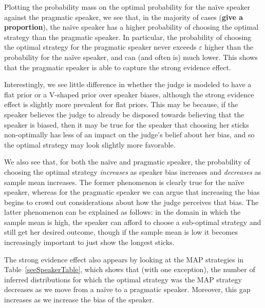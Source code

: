 \documentclass[10pt,letterpaper]{article}
\begin{document}
Plotting the probability mass on the optimal probability for the na\"ive speaker against the pragmatic speaker, we see that,
in the majority of cases (\textbf{give a proportion}), the na\"ive speaker has a higher probability of choosing the optimal 
strategy than the pragmatic speaker. In particular, the probability of choosing the optimal strategy for the pragmatic speaker never
exceeds $\varepsilon$ higher than the probability for the na\"ive speaker, and can (and often is) much lower. This shows that the 
pragmatic speaker is able to capture the strong evidence effect.

Interestingly, we see little difference in whether the judge is modeled to have a flat prior or a V-shaped prior over speaker biases,
although the strong evidence effect is slightly more prevalent for flat priors. This may be because, if the speaker believes the judge 
to already be disposed towards believing that the speaker is biased, then it may be true for the speaker that choosing her sticks 
non-optimally has less of an impact on the judge's belief about her bias, and so the optimal strategy may look slightly more 
favorable.

We also see that, for both the na\"ive and pragmatic speaker, the probability of choosing the optimal strategy \textit{increases} as
speaker bias increases and \textit{decreases} as sample mean increases. The former phenomenon is clearly true for the na\"ive speaker,
whereas for the pragmatic speaker we can argue that increasing the bias begins to crowd out considerations about how the judge perceives
that bias. The latter phenomenon can be explained as follows: in the domain in which the sample mean is high, the speaker
can afford to choose a sub-optimal strategy and still get her desired outcome, though if the sample mean is low it becomes 
increasingly important to just show the longest sticks.

The strong evidence effect also appears by looking at the MAP strategies in Table~\ref{seeSpeakerTable}, which shows that (with one exception),
the number of inferred distributions for which the optimal strategy was the MAP strategy decreases as we move from a 
na\"ive to a pragmatic speaker. Moreover, this gap increases as we increase the bias of the speaker.
\end{document}
